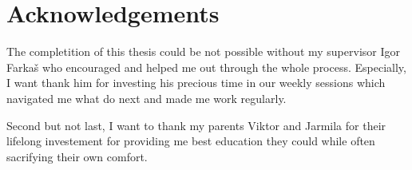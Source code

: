 
\section*{Acknowledgements}

The completition of this thesis could be not possible without my supervisor Igor Farkaš who encouraged and helped me out through the whole process. Especially, I want thank him for investing his precious time in our weekly sessions which navigated me what do next and made me work regularly. 

Second but not last, I want to thank my parents Viktor and Jarmila for their lifelong investement for providing me best education they could while often sacrifying their own comfort. 
